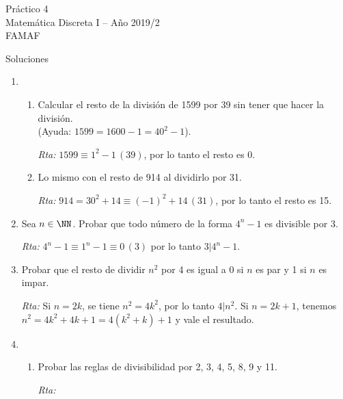 \documentclass[12pt,spanish,makeidx]{amsbook}
\newcommand{\rta}{\noindent\textit{Rta: }}
\newcommand{\md}[1]{{\,}\left(#1\right)}
\begin{document}
{\bf \begin{center} Práctico 4 \\ Matemática Discreta I -- Año 2019/2 \\ FAMAF \end{center}}

{\bf \begin{center} Soluciones \end{center}}

\begin{enumerate}
	\item  
	\begin{enumerate}
		\item Calcular el resto de la división de 1599 por 39 sin tener que hacer la división. \\(Ayuda: $1599=1600-1=40^2-1$).
		
		\rta $1599\equiv 1^2-1\md{ 39}$, por lo tanto el resto es 0.
		
		\item Lo mismo con el resto de 914 al dividirlo por 31.
		
		\rta $914=30^2+14\equiv (-1)^2+14 \md{ 31}$, por lo tanto el resto es 15.
	\end{enumerate}
	
	
	\smallskip
	\item Sea $n\in\NN$. Probar que todo número de la forma $4^n-1$ es divisible por 3.
	
	\rta $4^n-1\equiv 1^n-1 \equiv 0 \md 3$ por lo tanto $3\vert 4^n-1$.
	
	\smallskip
	\item Probar que el resto de dividir $n^2$ por 4 es igual a 0 si $n$ es par y 1 si $n$ es impar.
		
	\rta  Si $n=2k$, se tiene $n^2=4k^2$, por lo tanto $4\vert n^2$. Si $n=2k+1$, tenemos $n^2=4k^2+4k+1=4(k^2+k)+1$ y vale el resultado.
	
	
	
	\smallskip
	\item
	\begin{enumerate}
		\item
		Probar las reglas de divisibilidad por 2, 3, 4, 5, 8, 9 y 11.%
			
		\rta 
		

\end{enumerate}
\end{enumerate}
\end{document}
